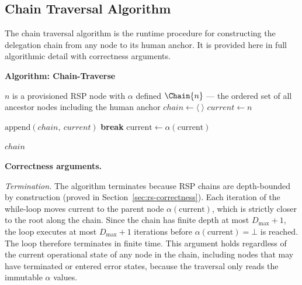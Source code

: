 \subsection{Chain Traversal Algorithm}
\label{sec:chain-traversal-algorithm}

The chain traversal algorithm is the runtime procedure for constructing the delegation chain from any node to its human anchor. It is provided here in full algorithmic detail with correctness arguments.

\bigskip
\noindent\textbf{Algorithm: Chain-Traverse}

\begin{algorithm}
\caption{Chain-Traverse($n$) --- Build the delegation chain from node $n$ to the human anchor}
\label{alg:chain-traverse}
\begin{algorithmic}[1]
\REQUIRE $n$ is a provisioned RSP node with $\alpha$ defined
\ENSURE $\Chain{n}$ --- the ordered set of all ancestor nodes including the human anchor
\STATE $chain \leftarrow \langle\ \rangle$ 
\STATE $current \leftarrow n$ 

    \STATE $\text{append}(chain,\ current)$ 
        \STATE \textbf{break} 
    \ENDIF
    \STATE $\text{current} \leftarrow \alpha(\text{current})$ 
\ENDWHILE

\RETURN $chain$
\end{algorithmic}
\end{algorithm}

\bigskip
\noindent\textbf{Correctness arguments.}

\textit{Termination.} The algorithm terminates because RSP chains are depth-bounded by construction (proved in Section~\ref{sec:rs-correctness}). Each iteration of the while-loop moves $\text{current}$ to the parent node $\alpha(\text{current})$, which is strictly closer to the root along the chain. Since the chain has finite depth at most $D_{\max} + 1$, the loop executes at most $D_{\max} + 1$ iterations before $\alpha(\text{current}) = \bot$ is reached. The loop therefore terminates in finite time. This argument holds regardless of the current operational state of any node in the chain, including nodes that may have terminated or entered error states, because the traversal only reads the immutable $\alpha$ values.

